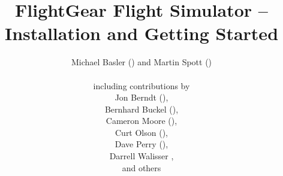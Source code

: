 
\thispagestyle{empty}
\title{FlightGear Flight Simulator -- Installation and Getting Started}

\author{
 Michael Basler () and Martin Spott ()\\\\
  including contributions by\\
  Jon Berndt (),\\
  Bernhard Buckel (),\\
  Cameron Moore (),\\
  Curt Olson (),\\
  Dave Perry (),\\
  Darrell Walisser {},\\  
  and others\\
{ \setlength{\fboxsep}{12mm}\setlength{\fboxrule}{0pt}
 \centerline{}}}

